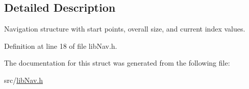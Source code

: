 \subsection{Detailed Description}
Navigation structure with start points, overall size, and current index values. 

Definition at line 18 of file lib\-Nav.\-h.



The documentation for this struct was generated from the following file\-:\begin{DoxyCompactItemize}
\item 
src/\hyperlink{libNav_8h}{lib\-Nav.\-h}\end{DoxyCompactItemize}
